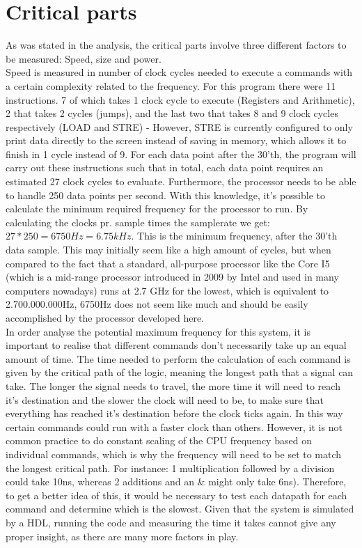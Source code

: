 \documentclass[12pt,a4paper]{article}
\begin{document}
\section{Critical parts}
	As was stated in the analysis, the critical parts involve three different factors to be measured: Speed, size and power.\\
	Speed is measured in number of clock cycles needed to execute a commands with a certain complexity related to the frequency. For this program there were 11 instructions. 7 of which takes 1 clock cycle to execute (Registers and Arithmetic), 2 that takes 2 cycles (jumps), and the last two that takes 8 and 9 clock cycles respectively (LOAD and STRE) - However, STRE is currently configured to only print data directly to the screen instead of saving in memory, which allows it to finish in 1 cycle instead of 9. For each data point after the 30'th, the program will carry out these instructions such that in total, each data point requires an estimated 27 clock cycles to evaluate. Furthermore, the processor needs to be able to handle 250 data points per second. With this knowledge, it's possible to calculate the minimum required frequency for the processor to run. By calculating the clocks pr. sample times the samplerate we get: $27*250=6750Hz=6.75kHz$. This is the minimum frequency, after the 30'th data sample. This may initially seem like a high amount of cycles, but when compared to the fact that a standard, all-purpose processor like the Core I5 (which is a mid-range processor introduced in 2009 by Intel and used in many computers nowadays) runs at 2.7 GHz for the lowest, which is equivalent to 2.700.000.000Hz, 6750Hz does not seem like much and should be easily accomplished by the processor developed here.\\
	In order analyse the potential maximum frequency for this system, it is important to realise that different commands don't necessarily take up an equal amount of time. The time needed to perform the calculation of each command is given by the critical path of the logic, meaning the longest path that a signal can take. The longer the signal needs to travel, the more time it will need to reach it's destination and the slower the clock will need to be, to make sure that everything has reached it's destination before the clock ticks again.
	In this way certain commands could run with a faster clock than others. However, it is not common practice to do constant scaling of the CPU frequency based on individual commands, which is why the frequency will need to be set to match the longest critical path. For instance: 1 multiplication followed by a division could take 10ns, whereas 2 additions and an \& might only take 6ns). Therefore, to get a better idea of this, it would be necessary to test each datapath for each command and determine which is the slowest. Given that the system is simulated by a HDL, running the code and measuring the time it takes cannot give any proper insight, as there are many more factors in play.\\
\end{document}
